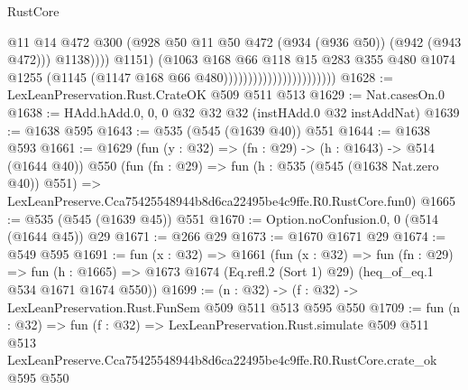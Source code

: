 \begin{lexlean}{RustCore}
\begin{coremodule}
                                                      @11
                                                      @14
                                                      @472
                                                      @300
                                                      (@928
                                                        @50
                                                        @11
                                                        @50
                                                        @472
                                                        (@934 (@936 @50))
                                                        (@942 (@943 @472)))
                                                      @1138))))
                                              @1151)
                                            (@1063
                                              @168
                                              @66
                                              @118
                                              @15
                                              @283
                                              @355
                                              @480
                                              @1074
                                              @1255
                                              (@1145 (@1147 @168 @66 @480)))))))))))))))))))))))
@1628 := LexLeanPreservation.Rust.CrateOK @509 @511 @513
@1629 := Nat.casesOn.{0}
@1638 := HAdd.hAdd.{0, 0, 0} @32 @32 @32 (instHAdd.{0} @32 instAddNat)
@1639 := @1638 @595
@1643 := @535 (@545 (@1639 @40)) @551
@1644 := @1638 @593
@1661 := @1629
    (fun (y : @32) => (fn : @29) -> (h : @1643) -> @514 (@1644 @40))
    @550
    (fun (fn : @29) =>
    fun (h : @535 (@545 (@1638 Nat.zero @40)) @551) =>
    LexLeanPreserve.Cca75425548944b8d6ca22495be4c9ffe.R0.RustCore.fun0)
@1665 := @535 (@545 (@1639 @45)) @551
@1670 := Option.noConfusion.{0, 0} (@514 (@1644 @45)) @29
@1671 := @266 @29
@1673 := @1670 @1671 @29
@1674 := @549 @595
@1691 := fun (x : @32) =>
  @1661
    (fun (x : @32) =>
    fun (fn : @29) =>
    fun (h : @1665) => @1673 @1674 (Eq.refl.{2} (Sort 1) @29) (heq_of_eq.{1} @534 @1671 @1674 @550))
@1699 := (n : @32) -> (f : @32) -> LexLeanPreservation.Rust.FunSem @509 @511 @513 @595 @550
@1709 := fun (n : @32) =>
  fun (f : @32) =>
  LexLeanPreservation.Rust.simulate
    @509
    @511
    @513
    LexLeanPreserve.Cca75425548944b8d6ca22495be4c9ffe.R0.RustCore.crate_ok
    @595
    @550
\end{coremodule}
\end{lexlean}
